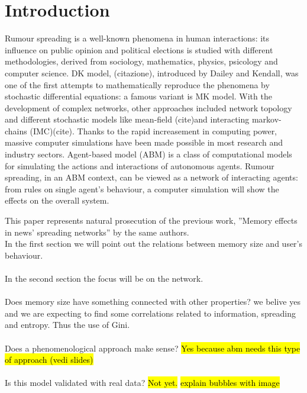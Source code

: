 \section{Introduction}
Rumour spreading is a well-known phenomena in human interactions: its influence on public opinion and political elections is studied with different methodologies, derived from sociology, mathematics, physics, psicology and computer science.
DK model, (citazione), introduced by Dailey and Kendall, was one of the first attempts to mathematically reproduce the phenomena by stochastic differential equations: a famous variant is MK model.
With the development of complex networks, other approaches included network topology 
and different stochastic models like mean-field (cite)and interacting markov-chains (IMC)(cite).
Thanks to the rapid increasement in computing power, massive computer simulations have been made possible in most research and industry sectors.
Agent-based model (ABM) is a class of computational models for simulating the actions and interactions of autonomous agents.
Rumour spreading, in an ABM context, can be viewed as a network of interacting agents: from rules on single agent's behaviour,  a computer simulation will show the effects on the overall system.



This paper represents natural prosecution of the previous work,
''Memory effects in news' spreading networks'' by the same authors.\\



In the first section we will point out the relations between memory size
and user's behaviour. \\ \\
In the second section the focus will be on the network.\\ \\
Does memory size have something connected with other properties?
we belive yes and we are expecting to find some correlations related
to information, spreading and entropy. Thus the use of Gini.\\ \\
Does a phenomenological approach make sense? \hl{Yes because abm needs
this type of approach (vedi slides)}\\ \\
Is this model validated with real data? \hl{Not yet.}
\hl{explain bubbles with image}